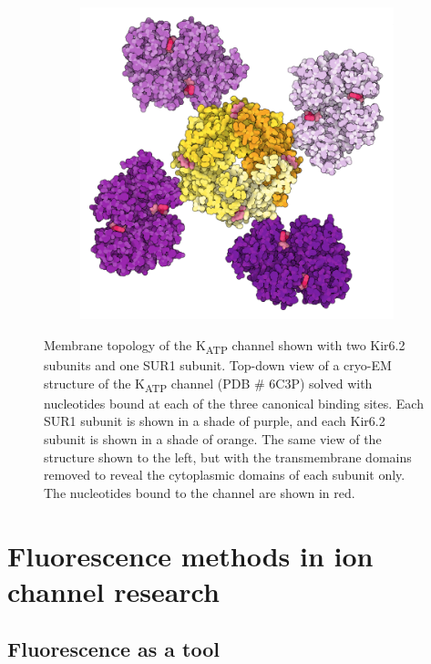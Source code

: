 \begin{figure}[h]
\begin{subfigure}[t]{0.45\textwidth}
		\includegraphics[width=\textwidth]{sur_topdown_ctd_propellor.pdf}
	\end{subfigure}
	\caption[K\textsubscript{ATP} architecture and nucleotide regulation]{
		 Membrane topology of the K\textsubscript{ATP} channel shown with two Kir6.2 subunits and one SUR1 subunit.
		 Top-down view of a cryo-EM structure of the K\textsubscript{ATP} channel (PDB \# 6C3P) solved with nucleotides bound at each of the three canonical binding sites.
		Each SUR1 subunit is shown in a shade of purple, and each Kir6.2 subunit is shown in a shade of orange.
		 The same view of the structure shown to the left, but with the transmembrane domains removed to reveal the cytoplasmic domains of each subunit only.
		The nucleotides bound to the channel are shown in red.
	}
\end{figure}

\section{Fluorescence methods in ion channel research}

\subsection{Fluorescence as a tool}

